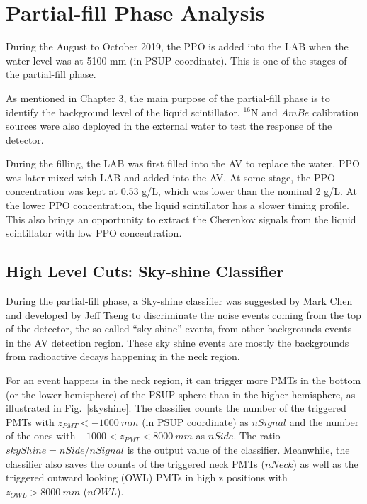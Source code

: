 \section{Partial-fill Phase Analysis}

During the August to October 2019, the PPO is added into the LAB when the water level was at 5100 mm (in PSUP coordinate). This is one of the stages of the partial-fill phase.

As mentioned in Chapter 3, the main purpose of the partial-fill phase is to identify the background level of the liquid scintillator. $^{16}$N and $AmBe$ calibration sources were also deployed in the external water to test the response of the detector. 

During the filling, the LAB was first filled into the AV to replace the water. PPO was later mixed with LAB and added into the AV. At some stage, the PPO concentration was kept at 0.53 g/L, which was lower than the nominal 2 g/L. At the lower PPO concentration, the liquid scintillator has a slower timing profile. This also brings an opportunity to extract the Cherenkov signals from the liquid scintillator with low PPO concentration.

\subsection{High Level Cuts: Sky-shine Classifier}
During the partial-fill phase, a Sky-shine classifier was suggested by Mark Chen and developed by Jeff Tseng to discriminate the noise events coming from the top of the detector, the so-called ``sky shine'' events, from other backgrounds events in the AV detection region\cite{skyshine}. These sky shine events are mostly the backgrounds from radioactive decays happening in the neck region. 

For an event happens in the neck region, it can trigger more PMTs in the bottom (or 
the lower hemisphere) of the PSUP sphere than in the higher hemisphere, as illustrated in Fig.~\ref{skyshine}. The classifier counts the number of the triggered PMTs with $z_{PMT}<-1000~mm$ (in PSUP coordinate) as $nSignal$ and the number of the ones with $-1000<z_{PMT}<8000~mm$ as $nSide$. The ratio $skyShine=nSide/nSignal$ is the output value of the classifier. Meanwhile, the classifier also saves the counts of the triggered neck PMTs ($nNeck$) as well as the triggered outward looking (OWL) PMTs in high z positions with $z_{OWL}>8000~mm$ ($nOWL$).

